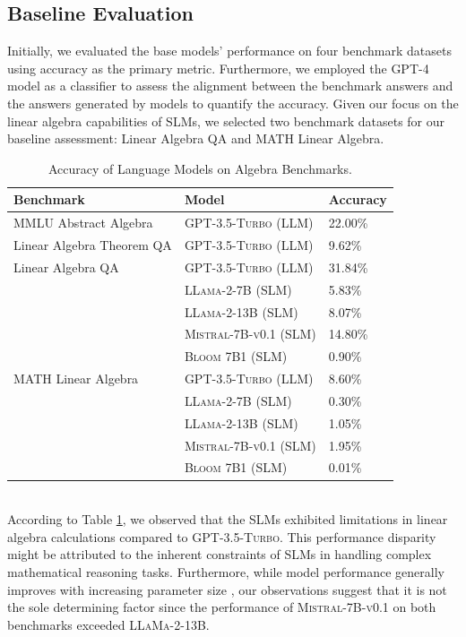 \documentclass[10pt]{article}
\begin{document}
\subsection{Baseline Evaluation}
Initially, we evaluated the base models' performance on four benchmark datasets using accuracy as the primary metric. Furthermore, we employed the \textsc{GPT-4} model as a classifier to assess the alignment between the benchmark answers and the answers generated by models to quantify the accuracy. Given our focus on the linear algebra capabilities of SLMs, we selected two  benchmark datasets for our baseline assessment: Linear Algebra QA and MATH Linear Algebra.
\begin{table}[ht]
\centering
\renewcommand{\arraystretch}{0.8} %
\setlength{\tabcolsep}{10pt} %
\begin{tabular}{p{6cm} p{6cm} p{2cm}}
\toprule
\textbf{Benchmark} & \textbf{Model} & \textbf{Accuracy} \\
\midrule
MMLU Abstract Algebra 
    & \textsc{GPT-3.5-Turbo} (LLM) & 22.00\% \\
\midrule
Linear Algebra Theorem QA 
    & \textsc{GPT-3.5-Turbo} (LLM) & 9.62\% \\
\midrule
Linear Algebra QA 
    & \textsc{GPT-3.5-Turbo} (LLM) & 31.84\% \\
    & \textsc{LLama-2-7B} (SLM) & 5.83\% \\
    & \textsc{LLama-2-13B} (SLM) & 8.07\% \\
    & \textsc{Mistral-7B-v0.1} (SLM) & 14.80\% \\
    & \textsc{Bloom 7B1} (SLM) & 0.90\% \\
\midrule
MATH Linear Algebra 
    & \textsc{GPT-3.5-Turbo} (LLM) & 8.60\% \\
    & \textsc{LLama-2-7B} (SLM) & 0.30\% \\
    & \textsc{LLama-2-13B} (SLM) & 1.05\% \\
    & \textsc{Mistral-7B-v0.1} (SLM) & 1.95\% \\
    & \textsc{Bloom 7B1} (SLM) & 0.01\% \\
\bottomrule
\end{tabular}
\caption{Accuracy of Language Models on Algebra Benchmarks.}
\label{tab:model-performance}
\end{table}
\\
According to Table \ref{tab:model-performance}, we observed that the SLMs exhibited limitations in linear algebra calculations compared to \textsc{GPT-3.5-Turbo}. This performance disparity might be attributed to the inherent constraints of SLMs in handling complex mathematical reasoning tasks. Furthermore, while model performance generally improves with increasing parameter size \cite{kaplan2020scalinglawsneurallanguage}, our observations suggest that it is not the sole determining factor since the performance of \textsc{Mistral-7B-v0.1} on both benchmarks exceeded \textsc{LLaMa-2-13B}.
\end{document}
